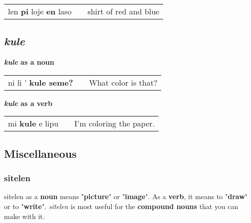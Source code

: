 \begin{supertabular}{p{5,5cm}|ll}
len \textbf{pi} loje \textbf{en} laso && shirt of red and blue \\
\end{supertabular} 
%
\subsection*{\textit{kule}}
%
\textbf{\textit{kule} as a noun} \\
\begin{supertabular}{p{5,5cm}|ll}
ni li ' \textbf{kule seme?} && What color is that? \\
\end{supertabular} 

\textbf{\textit{kule} as a verb} \\
\begin{supertabular}{p{5,5cm}|ll}
mi \textbf{kule} e lipu && I'm coloring the paper. \\
\end{supertabular} 
%
\newpage
\subsection*{Miscellaneous}
\subsubsection*{sitelen}
%
sitelen as a \textbf{noun} means "\textbf{picture}" or "\textbf{image}". 
As a \textbf{verb}, it means to "\textbf{draw}" or to "\textbf{write}". 
\textit{sitelen} is most useful for the \textbf{compound nouns} that you can make with it. 

